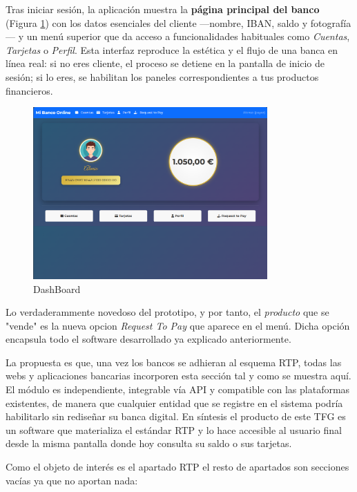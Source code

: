 Tras iniciar sesión, la aplicación muestra la \textbf{página principal del banco} (Figura \ref{fig:DashBoard}) con los datos esenciales del cliente —nombre, IBAN, saldo y fotografía— y un menú superior que da acceso a funcionalidades habituales como \emph{Cuentas}, \emph{Tarjetas} o \emph{Perfil}. Esta interfaz reproduce la estética y el flujo de una banca en línea real: si no eres cliente, el proceso se detiene en la pantalla de inicio de sesión; si lo eres, se habilitan los paneles correspondientes a tus productos financieros.

\begin{figure}[H]
  \centering
  \includegraphics[width=0.8\textwidth]{Imagenes/DashBoard.png}
  \caption{DashBoard}
  \label{fig:DashBoard}
\end{figure}

Lo verdaderammente novedoso del prototipo, y por tanto, el \emph{producto} que se "vende" es la nueva opcion \emph{Request To Pay} que aparece en el menú. Dicha opción encapsula todo el software desarrollado ya explicado anteriormente.

La propuesta es que, una vez los bancos se adhieran al esquema RTP, todas las webs y aplicaciones bancarias incorporen esta sección tal y como se muestra aquí. El módulo es independiente, integrable vía API y compatible con las plataformas existentes, de manera que cualquier entidad que se registre en el sistema podría habilitarlo sin rediseñar su banca digital. En síntesis el producto de este TFG es un software que materializa el estándar RTP y lo hace accesible al usuario final desde la misma pantalla donde hoy consulta su saldo o sus tarjetas.

Como el objeto de interés es el apartado RTP el resto de apartados son secciones vacías ya que no aportan nada:

